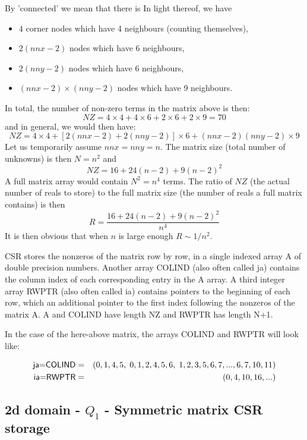 By 'connected' we mean that there is 
In light thereof, we have
\begin{itemize}
\item $4$ corner nodes which have 4 neighbours (counting themselves), 
\item $2(nnx-2)$ nodes which have 6 neighbours,
\item $2(nny-2)$ nodes which have 6 neighbours,
\item $(nnx-2)\times(nny-2)$ nodes which have 9 neighbours.
\end{itemize}
In total, the number of non-zero terms in the matrix above is then:
\[
NZ=4\times4+4\times6+2\times6+2\times9=70
\]
and in general, we would then have:
\[
NZ=4\times4+[2(nnx-2)+2(nny-2)]\times6 + (nnx-2)(nny-2)\times9
\]
Let us temporarily assume $nnx=nny=n$. The matrix size (total
number of unknowns) is then $N=n^2$ and  
\[
NZ=16+24(n-2)+9(n-2)^2
\]
A full matrix array would contain $N^2=n^4$ terms. 
The ratio of $NZ$ (the actual number of reals to store)
to the full matrix size (the number of reals a full matrix contains) is then 
\[
R = \frac{16+24(n-2)+9(n-2)^2}{n^4}
\]
It is then obvious that when $n$ is large enough $R \sim 1/n^2$.

CSR stores the nonzeros of the matrix row by row, in a
single indexed array {\sffamily A} of double precision  numbers.
Another array {\sffamily COLIND} (also often called {\sffamily ja}) 
contains the column index of each
corresponding entry in the {\sffamily A} array. A third integer array 
{\sffamily RWPTR} (also often called {\sffamily ia})
contains pointers to the beginning of each row, which an additional pointer to
the first index following the nonzeros of the matrix {\sffamily A}.
{\sffamily A} and {\sffamily COLIND} have length {\sffamily NZ} 
and {\sffamily RWPTR} has length {\sffamily N+1}.

In the case of the here-above matrix, the arrays {\sffamily COLIND} and 
{\sffamily RWPTR} will look like:

\begin{eqnarray}
\text{\sffamily ja=COLIND}&=&(0,1,4,5, \; 0,1,2,4,5,6, \; 1,2,3,5,6,7, ..., 6,7,10,11) \nonumber\\
\text{\sffamily ia=RWPTR} &=&(0,4,10,16, ... )   \nonumber
\end{eqnarray}

\subsection{2d domain - $Q_1$ - Symmetric matrix CSR storage} \label{ss:symmcsrss}

